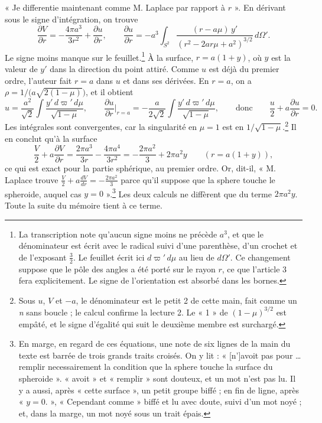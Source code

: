 \documentclass[11pt,a4paper]{article}
\begin{document}
« Je differentie maintenant comme M. Laplace par rapport à \(r\) ». En
dérivant sous le signe d'intégration, on trouve
\[
\frac{\partial V}{\partial r}=-\frac{4\pi a^3}{3r^2}+\frac{\partial u}{\partial r},
\qquad
\frac{\partial u}{\partial r}=-a^3\int_{S^2}\frac{(r-a\mu)\,y'}{(r^2-2ar\mu+a^2)^{3/2}}\,d\Omega'.
\]
Le signe moins manque sur le feuillet.\footnote{La transcription note
qu'aucun signe moins ne précède \(a^3\), et que le dénominateur est écrit avec
le radical suivi d'une parenthèse, d'un crochet et de l'exposant
\(\frac32\). Le feuillet écrit ici \(d\varpi'\,d\mu\) au lieu de
\(d\Omega'\). Ce changement suppose que le pôle des angles a été porté sur le
rayon \(r\), ce que l'article 3 fera explicitement. Le signe de l'orientation
est absorbé dans les bornes.} À la surface, \(r=a(1+y)\), où \(y\) est la
valeur de \(y'\) dans la direction du point attiré. Comme \(u\) est déjà du
premier ordre, l'auteur fait \(r=a\) dans \(u\) et dans ses dérivées. En
\(r=a\), on a \(\rho=1/\bigl(a\sqrt{2(1-\mu)}\bigr)\), et il obtient
\[
u=\frac{a^2}{\sqrt2}\int\frac{y'\,d\varpi'\,d\mu}{\sqrt{1-\mu}},\qquad
\frac{\partial u}{\partial r}\Big|_{r=a}=-\frac{a}{2\sqrt2}\int\frac{y'\,d\varpi'\,d\mu}{\sqrt{1-\mu}},
\qquad\text{donc}\qquad \frac u2+a\frac{\partial u}{\partial r}=0 .
\]
Les intégrales sont convergentes, car la singularité en \(\mu=1\) est en
\(1/\sqrt{1-\mu}\).\footnote{Sous \(u\), \(V\) et \(-a\), le dénominateur est
le petit 2 de cette main, fait comme un \emph{n} sans boucle ; le calcul
confirme la lecture 2. Le « 1 » de \((1-\mu)^{3/2}\) est empâté, et le signe
d'égalité qui suit le deuxième membre est surchargé.} Il en conclut qu'à la
surface
\[
\frac V2+a\frac{\partial V}{\partial r}=\frac{2\pi a^3}{3r}-\frac{4\pi a^4}{3r^2}
=-\frac{2\pi a^2}{3}+2\pi a^2y\qquad(r=a(1+y)),
\]
ce qui est exact pour la partie sphérique, au premier ordre. Or, dit-il,
« M. Laplace trouve \(\frac V2+a\frac{dV}{dr}=-\frac{2\pi a^2}{3}\) parce qu'il
suppose que la sphere touche le spheroide, auquel cas \(y=0\) ».\footnote{En
marge, en regard de ces équations, une note de six lignes de la main du texte
est barrée de trois grands traits croisés. On y lit : « [n']avoit pas pour
\ldots{} remplir necessairement la condition que la sphere touche la surface du
spheroide ». « avoit » et « remplir » sont douteux, et un mot n'est pas lu. Il
y a aussi, après « cette surface », un petit groupe biffé ; en fin de ligne,
après « \(y=0\). », « Cependant comme » biffé et lu avec doute, suivi d'un mot
noyé ; et, dans la marge, un mot noyé sous un trait épais.} Les deux calculs ne
diffèrent que du terme \(2\pi a^2y\). Toute la suite du mémoire tient à ce
terme.
\end{document}
